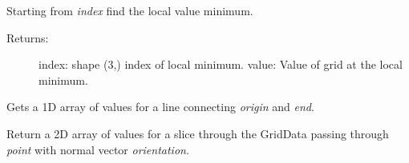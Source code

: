 \documentclass[letterpaper,10pt,english]{sphinxmanual}
\begin{document}
\begin{fulllineitems}
\begin{fulllineitems}
\end{fulllineitems}


\begin{fulllineitems}
\label{models:qmpy.GridData.local_min}
Starting from \emph{index} find the local value minimum.
\begin{description}
\item[{Returns:}] \leavevmode
index: shape (3,) index of local minimum.
value: Value of grid at the local minimum.

\end{description}

\end{fulllineitems}


\begin{fulllineitems}
\label{models:qmpy.GridData.path}
Gets a 1D array of values for a line connecting \emph{origin} and \emph{end}.

\end{fulllineitems}


\begin{fulllineitems}
\label{models:qmpy.GridData.slice}
Return a 2D array of values for a slice through the GridData passing
through \emph{point} with normal vector \emph{orientation}.

\end{fulllineitems}


\end{fulllineitems}

\end{document}
